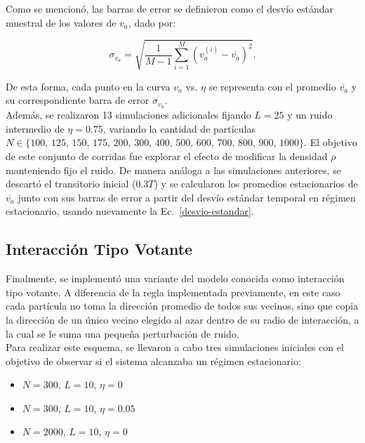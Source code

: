 \documentclass[12pt,a4paper]{article}
\begin{document}
Como se mencionó, las barras de error se definieron como el desvío estándar muestral de los valores de $v_a$, dado por:

\begin{equation}
    \label{desvio-estandar}
    \sigma_{v_a} = \sqrt{\frac{1}{M-1} \sum_{i=1}^{M} \left( v_a^{(i)} - \overline{v_a} \right)^2 } .
\end{equation}

De esta forma, cada punto en la curva $v_a$ vs. $\eta$ se representa con el promedio $\overline{v_a}$ y su correspondiente 
barra de error $\sigma_{v_a}$.\\

Además, se realizaron 13 simulaciones adicionales fijando $L=25$ y un ruido intermedio de $\eta=0.75$, variando la cantidad de partículas $N \in \{100,\,125,\,150,\,175,\,200,\,300,\,400,\,500,\,600,\,700,\,800,\,900,\,1000\}$. El objetivo de este conjunto de corridas fue explorar el efecto de modificar la densidad $\rho$ manteniendo fijo el ruido. De manera análoga a las simulaciones anteriores, se descartó el transitorio inicial ($0.3T$) y se calcularon los promedios estacionarios de $\overline{v_a}$ junto con sus barras de error a partir del desvío estándar temporal en régimen estacionario, usando nuevamente la Ec.~\eqref{desvio-estandar}.

\subsection{Interacción Tipo Votante}
\label{interaccion-tipo-votante}

Finalmente, se implementó una variante del modelo conocida como interacción tipo votante. A diferencia de la regla implementada previamente, en este caso cada partícula no toma la dirección promedio de todos sus vecinos, sino que copia la dirección de un único vecino elegido al azar dentro de su radio de interacción, a la cual se le suma una pequeña perturbación de ruido.\\

Para realizar este esquema, se llevaron a cabo tres simulaciones iniciales con el objetivo de observar si el sistema alcanzaba un régimen estacionario:
\begin{itemize}
    \item $N=300$, $L=10$, $\eta=0$
    \item $N=300$, $L=10$, $\eta=0.05$
    \item $N=2000$, $L=10$, $\eta=0$
\end{itemize}
\end{document}
